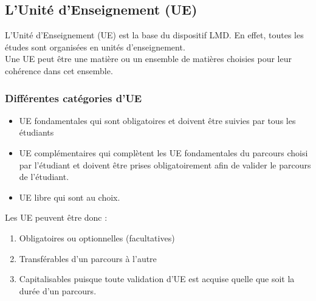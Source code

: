 \subsection{L'Unité d'Enseignement (UE)}
L'Unité d'Enseignement (UE) est la base du dispositif LMD. En effet, toutes les études sont organisées en unités d'enseignement.\\
Une UE peut être une matière ou un ensemble de matières choisies pour leur cohérence dans cet ensemble.

\subsubsection{Différentes catégories d'UE}
\begin{itemize}
	\item UE fondamentales qui sont obligatoires et doivent être suivies par tous les étudiants
	\item UE complémentaires qui complètent les UE fondamentales du parcours choisi par l'étudiant et doivent être prises obligatoirement afin de valider le parcours de l'étudiant.
	\item UE libre qui sont au choix.
\end{itemize}
\medskip

Les UE peuvent être donc : 
\begin{enumerate}
	\item Obligatoires ou optionnelles (facultatives)
	\item Transférables d'un parcours à l'autre
	\item Capitalisables puisque toute validation d'UE est acquise quelle que soit la durée d'un parcours.
\end{enumerate}

